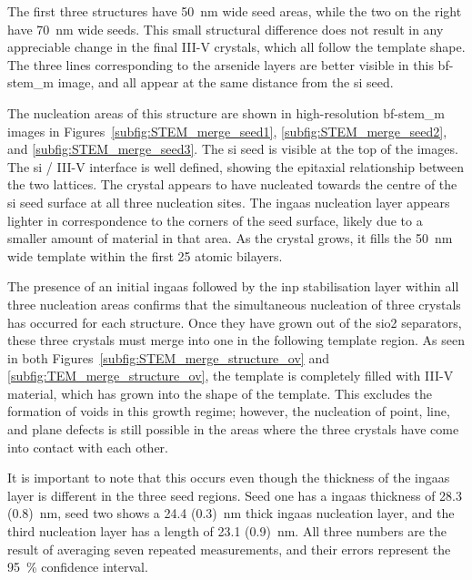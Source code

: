 The first three structures have \qty{50}{\nano\metre} wide seed areas, while the two on the right have \qty{70}{\nano\metre} wide seeds. This small structural difference does not result in any appreciable change in the final III-V crystals, which all follow the template shape. The three lines corresponding to the arsenide layers are better visible in this \acs{bf}-\acs{stem_m} image, and all appear at the same distance from the \acs{si} seed.

The nucleation areas of this structure are shown in high-resolution \acs{bf}-\acs{stem_m} images in Figures~\ref{subfig:STEM_merge_seed1}, \ref{subfig:STEM_merge_seed2}, and \ref{subfig:STEM_merge_seed3}. The \acl{si} seed is visible at the top of the images. The \acs{si} / III-V interface is well defined, showing the epitaxial relationship between the two lattices. The crystal appears to have nucleated towards the centre of the \acs{si} seed surface at all three nucleation sites. The \acs{ingaas} nucleation layer appears lighter in correspondence to the corners of the seed surface, likely due to a smaller amount of material in that area. As the crystal grows, it fills the \qty{50}{\nano\metre} wide template within the first 25 atomic bilayers.

The presence of an initial \acs{ingaas} followed by the \acs{inp} stabilisation layer within all three nucleation areas confirms that the simultaneous nucleation of three crystals has occurred for each structure. Once they have grown out of the \acs{sio2} separators, these three crystals must merge into one in the following template region. As seen in both Figures~\ref{subfig:STEM_merge_structure_ov} and \ref{subfig:TEM_merge_structure_ov}, the template is completely filled with III-V material, which has grown into the shape of the template. This excludes the formation of voids in this growth regime; however, the nucleation of point, line, and plane defects is still possible in the areas where the three crystals have come into contact with each other. 

It is important to note that this occurs even though the thickness of the \acs{ingaas} layer is different in the three seed regions. Seed one has a \acs{ingaas} thickness of \qty[separate-uncertainty=true]{28.3 (0.8)}{\nano\metre}, seed two shows a \qty[separate-uncertainty=true]{24.4 (0.3)}{\nano\metre} thick \acs{ingaas} nucleation layer, and the third nucleation layer has a length of \qty[separate-uncertainty=true]{23.1 (0.9)}{\nano\metre}. All three numbers are the result of averaging seven repeated measurements, and their errors represent the \qty{95}{\%} confidence interval. 

